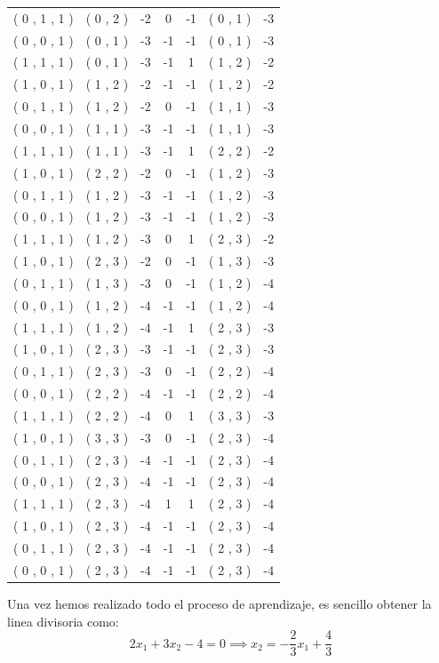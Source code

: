 \begin{problem}[11]
\begin{center}
\begin{tabular}{|c|c|c|c|c|c|c|}
( 0 , 1 , 1 ) & ( 0 , 2 ) &  -2  &  0  &  -1  & ( 0 , 1 ) &  -3  \\
( 0 , 0 , 1 ) & ( 0 , 1 ) &  -3  &  -1  &  -1  & ( 0 , 1 ) &  -3  \\
( 1 , 1 , 1 ) & ( 0 , 1 ) &  -3  &  -1  &  1  & ( 1 , 2 ) &  -2  \\
( 1 , 0 , 1 ) & ( 1 , 2 ) &  -2  &  -1  &  -1  & ( 1 , 2 ) &  -2  \\
( 0 , 1 , 1 ) & ( 1 , 2 ) &  -2  &  0  &  -1  & ( 1 , 1 ) &  -3  \\
( 0 , 0 , 1 ) & ( 1 , 1 ) &  -3  &  -1  &  -1  & ( 1 , 1 ) &  -3  \\
( 1 , 1 , 1 ) & ( 1 , 1 ) &  -3  &  -1  &  1  & ( 2 , 2 ) &  -2  \\
( 1 , 0 , 1 ) & ( 2 , 2 ) &  -2  &  0  &  -1  & ( 1 , 2 ) &  -3  \\
( 0 , 1 , 1 ) & ( 1 , 2 ) &  -3  &  -1  &  -1  & ( 1 , 2 ) &  -3  \\
( 0 , 0 , 1 ) & ( 1 , 2 ) &  -3  &  -1  &  -1  & ( 1 , 2 ) &  -3  \\
( 1 , 1 , 1 ) & ( 1 , 2 ) &  -3  &  0  &  1  & ( 2 , 3 ) &  -2  \\
( 1 , 0 , 1 ) & ( 2 , 3 ) &  -2  &  0  &  -1  & ( 1 , 3 ) &  -3  \\
( 0 , 1 , 1 ) & ( 1 , 3 ) &  -3  &  0  &  -1  & ( 1 , 2 ) &  -4  \\
( 0 , 0 , 1 ) & ( 1 , 2 ) &  -4  &  -1  &  -1  & ( 1 , 2 ) &  -4  \\
( 1 , 1 , 1 ) & ( 1 , 2 ) &  -4  &  -1  &  1  & ( 2 , 3 ) &  -3  \\
( 1 , 0 , 1 ) & ( 2 , 3 ) &  -3  &  -1  &  -1  & ( 2 , 3 ) &  -3  \\
( 0 , 1 , 1 ) & ( 2 , 3 ) &  -3  &  0  &  -1  & ( 2 , 2 ) &  -4  \\
( 0 , 0 , 1 ) & ( 2 , 2 ) &  -4  &  -1  &  -1  & ( 2 , 2 ) &  -4  \\
( 1 , 1 , 1 ) & ( 2 , 2 ) &  -4  &  0  &  1  & ( 3 , 3 ) &  -3  \\
( 1 , 0 , 1 ) & ( 3 , 3 ) &  -3  &  0  &  -1  & ( 2 , 3 ) &  -4  \\
( 0 , 1 , 1 ) & ( 2 , 3 ) &  -4  &  -1  &  -1  & ( 2 , 3 ) &  -4  \\
( 0 , 0 , 1 ) & ( 2 , 3 ) &  -4  &  -1  &  -1  & ( 2 , 3 ) &  -4  \\
( 1 , 1 , 1 ) & ( 2 , 3 ) &  -4  &  1  &  1  & ( 2 , 3 ) &  -4  \\
( 1 , 0 , 1 ) & ( 2 , 3 ) &  -4  &  -1  &  -1  & ( 2 , 3 ) &  -4  \\
( 0 , 1 , 1 ) & ( 2 , 3 ) &  -4  &  -1  &  -1  & ( 2 , 3 ) &  -4  \\
( 0 , 0 , 1 ) & ( 2 , 3 ) &  -4  &  -1  &  -1  & ( 2 , 3 ) &  -4  \\

\hline
\end{tabular}
\end{center}

Una vez hemos realizado todo el proceso de aprendizaje, es sencillo obtener la linea divisoria como:
\[2x_1+3x_2-4 = 0 \implies x_2 = -\frac{2}{3}x_1+\frac{4}{3}\]

\end{problem}

